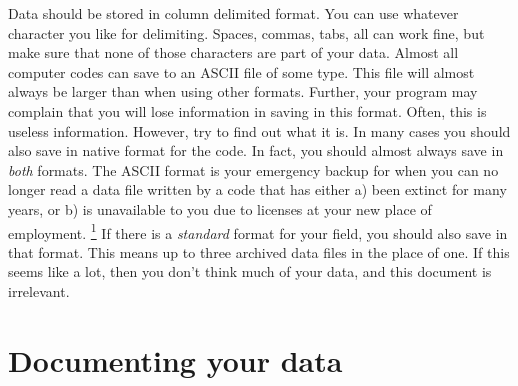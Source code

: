 \documentclass[a4paper]{article}
\providecommand*{\DUfootnotemark}[3]{%
  \raisebox{1em}{\hypertarget{#1}{}}%
  \hyperlink{#2}{\textsuperscript{#3}}%
}
\begin{document}
Data should be stored in column delimited format. You can use whatever
character you like for delimiting. Spaces, commas, tabs, all can work
fine, but make sure that none of those characters are part of your data.
Almost all computer codes can save to an ASCII file of some type. This
file will almost always be larger than when using other formats.
Further, your program may complain that you will lose information in
saving in this format. Often, this is useless information. However, try
to find out what it is. In many cases you should also save in native
format for the code. In fact, you should almost always save in \emph{both}
formats. The ASCII format is your emergency backup for when you can no
longer read a data file written by a code that has either a) been
extinct for many years, or b) is unavailable to you due to licenses at
your new place of employment.\DUfootnotemark{id3}{id6}{1} If there is a \emph{standard} format for
your field, you should also save in that format. This means up to three
archived data files in the place of one. If this seems like a lot, then
you don't think much of your data, and this document is irrelevant.


\section{Documenting your data%
  \label{documenting-your-data}%
}
\end{document}
